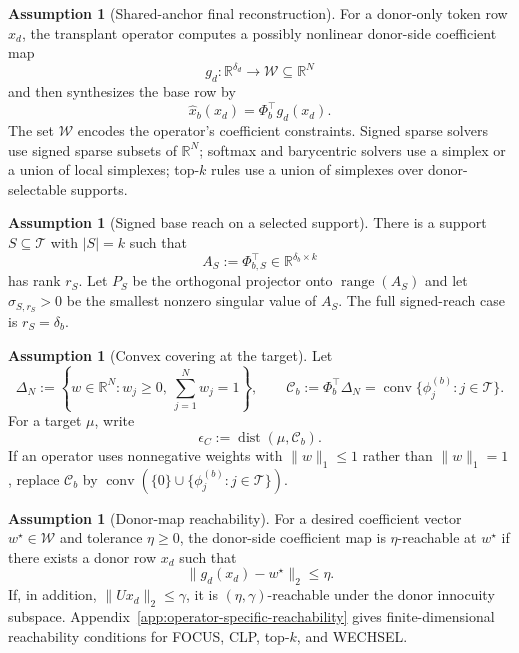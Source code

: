 \documentclass{article}
\theoremstyle{plain}
\theoremstyle{definition}
\newtheorem{assumption}[theorem]{Assumption}
\theoremstyle{remark}
\begin{document}
\begin{assumption}[Shared-anchor final reconstruction]
\label{ass:shared-anchor-final}
For a donor-only token row $x_d$, the transplant operator computes a possibly nonlinear donor-side coefficient map
\[
g_d:\mathbb{R}^{\delta_d}\to\mathcal{W}\subseteq\mathbb{R}^N
\]
and then synthesizes the base row by
\[
\widehat{x}_b(x_d)=\Phi_b^\top g_d(x_d).
\]
The set $\mathcal{W}$ encodes the operator's coefficient constraints. Signed sparse solvers use signed sparse subsets of $\mathbb{R}^N$; softmax and barycentric solvers use a simplex or a union of local simplexes; top-$k$ rules use a union of simplexes over donor-selectable supports.
\end{assumption}

\begin{assumption}[Signed base reach on a selected support]
\label{ass:signed-span}
There is a support $S\subseteq\mathcal{T}$ with $|S|=k$ such that
\[
A_S:=\Phi_{b,S}^\top\in\mathbb{R}^{\delta_b\times k}
\]
has rank $r_S$. Let $P_S$ be the orthogonal projector onto $\operatorname{range}(A_S)$ and let $\sigma_{S,r_S}>0$ be the smallest nonzero singular value of $A_S$. The full signed-reach case is $r_S=\delta_b$.
\end{assumption}

\begin{assumption}[Convex covering at the target]
\label{ass:convex-cover}
Let
\[
\Delta_N:=\left\{w\in\mathbb{R}^N:w_j\ge 0,\ \sum_{j=1}^N w_j=1\right\},
\qquad
\mathcal{C}_b:=\Phi_b^\top\Delta_N
=
\operatorname{conv}\{\phi_j^{(b)}:j\in\mathcal{T}\}.
\]
For a target $\mu$, write
\[
\epsilon_C:=\operatorname{dist}(\mu,\mathcal{C}_b).
\]
If an operator uses nonnegative weights with $\|w\|_1\le 1$ rather than $\|w\|_1=1$, replace $\mathcal{C}_b$ by $\operatorname{conv}(\{0\}\cup\{\phi_j^{(b)}:j\in\mathcal{T}\})$.
\end{assumption}

\begin{assumption}[Donor-map reachability]
\label{ass:donor-reachability}
For a desired coefficient vector $w^\star\in\mathcal{W}$ and tolerance $\eta\ge 0$, the donor-side coefficient map is $\eta$-reachable at $w^\star$ if there exists a donor row $x_d$ such that
\[
\|g_d(x_d)-w^\star\|_2\le \eta.
\]
If, in addition, $\|Ux_d\|_2\le\gamma$, it is $(\eta,\gamma)$-reachable under the donor innocuity subspace. Appendix~\ref{app:operator-specific-reachability} gives finite-dimensional reachability conditions for FOCUS, CLP, top-$k$, and WECHSEL.
\end{assumption}
\end{document}
